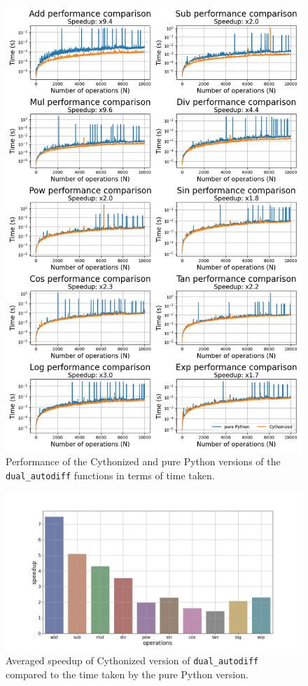 \documentclass[11pt,a4paper]{article}
\begin{document}
\begin{figure}
    \centering
    \includegraphics[width=\columnwidth, keepaspectratio]{../time.png}
    \caption{Performance of the Cythonized and pure Python versions of the \texttt{dual\_autodiff} functions in terms of time taken.}
    \label{fig:timediff}
\end{figure}

\begin{figure}
    \centering
    \includegraphics[width=\columnwidth, keepaspectratio]{../speedup.png}
    \caption{Averaged speedup of Cythonized version of \texttt{dual\_autodiff} compared to the time taken by the pure Python version.}
    \label{fig:speedup}
\end{figure}
\end{document}
